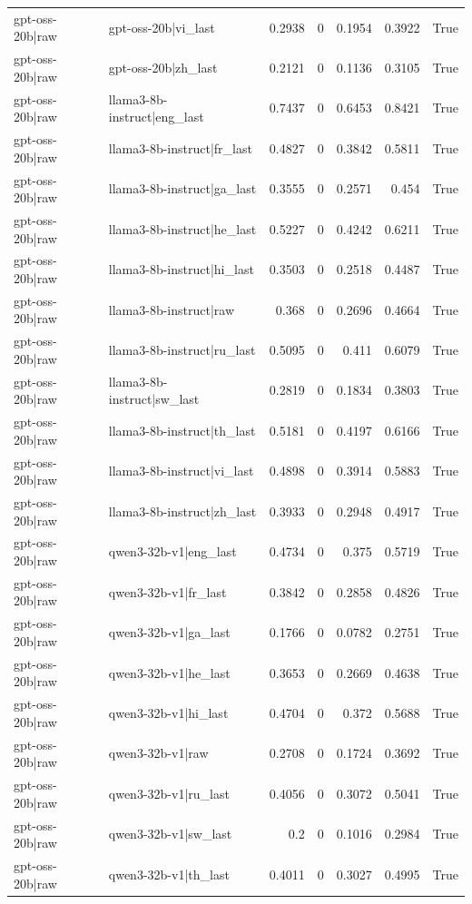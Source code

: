 \begin{table}
\begin{tabular}{l l r r r r l}
gpt-oss-20b|raw & gpt-oss-20b|vi_last & 0.2938 & 0 & 0.1954 & 0.3922 & True \\
gpt-oss-20b|raw & gpt-oss-20b|zh_last & 0.2121 & 0 & 0.1136 & 0.3105 & True \\
gpt-oss-20b|raw & llama3-8b-instruct|eng_last & 0.7437 & 0 & 0.6453 & 0.8421 & True \\
gpt-oss-20b|raw & llama3-8b-instruct|fr_last & 0.4827 & 0 & 0.3842 & 0.5811 & True \\
gpt-oss-20b|raw & llama3-8b-instruct|ga_last & 0.3555 & 0 & 0.2571 & 0.454 & True \\
gpt-oss-20b|raw & llama3-8b-instruct|he_last & 0.5227 & 0 & 0.4242 & 0.6211 & True \\
gpt-oss-20b|raw & llama3-8b-instruct|hi_last & 0.3503 & 0 & 0.2518 & 0.4487 & True \\
gpt-oss-20b|raw & llama3-8b-instruct|raw & 0.368 & 0 & 0.2696 & 0.4664 & True \\
gpt-oss-20b|raw & llama3-8b-instruct|ru_last & 0.5095 & 0 & 0.411 & 0.6079 & True \\
gpt-oss-20b|raw & llama3-8b-instruct|sw_last & 0.2819 & 0 & 0.1834 & 0.3803 & True \\
gpt-oss-20b|raw & llama3-8b-instruct|th_last & 0.5181 & 0 & 0.4197 & 0.6166 & True \\
gpt-oss-20b|raw & llama3-8b-instruct|vi_last & 0.4898 & 0 & 0.3914 & 0.5883 & True \\
gpt-oss-20b|raw & llama3-8b-instruct|zh_last & 0.3933 & 0 & 0.2948 & 0.4917 & True \\
gpt-oss-20b|raw & qwen3-32b-v1|eng_last & 0.4734 & 0 & 0.375 & 0.5719 & True \\
gpt-oss-20b|raw & qwen3-32b-v1|fr_last & 0.3842 & 0 & 0.2858 & 0.4826 & True \\
gpt-oss-20b|raw & qwen3-32b-v1|ga_last & 0.1766 & 0 & 0.0782 & 0.2751 & True \\
gpt-oss-20b|raw & qwen3-32b-v1|he_last & 0.3653 & 0 & 0.2669 & 0.4638 & True \\
gpt-oss-20b|raw & qwen3-32b-v1|hi_last & 0.4704 & 0 & 0.372 & 0.5688 & True \\
gpt-oss-20b|raw & qwen3-32b-v1|raw & 0.2708 & 0 & 0.1724 & 0.3692 & True \\
gpt-oss-20b|raw & qwen3-32b-v1|ru_last & 0.4056 & 0 & 0.3072 & 0.5041 & True \\
gpt-oss-20b|raw & qwen3-32b-v1|sw_last & 0.2 & 0 & 0.1016 & 0.2984 & True \\
gpt-oss-20b|raw & qwen3-32b-v1|th_last & 0.4011 & 0 & 0.3027 & 0.4995 & True \\

\end{tabular}
\end{table}
